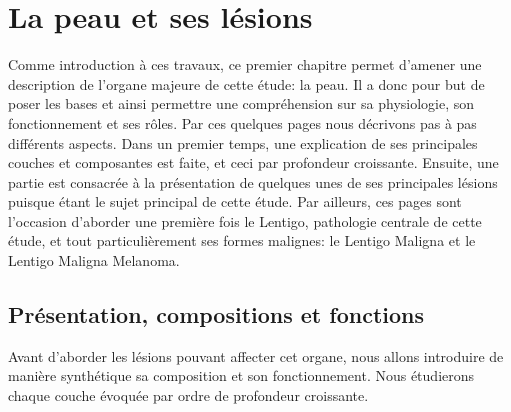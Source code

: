 \chapter{La peau et ses lésions}
\label{chap:chapter_1}
\chapterintro
Comme introduction à ces travaux, ce premier chapitre permet d'amener une description de l'organe majeure de cette étude: la peau. Il a donc pour but de poser les bases et ainsi permettre une compréhension sur sa physiologie, son fonctionnement et ses rôles. Par ces quelques pages nous décrivons pas à pas différents aspects. Dans un premier temps, une explication de ses principales couches et composantes est faite, et ceci par profondeur croissante. Ensuite, une partie est consacrée à la présentation de quelques unes de ses principales lésions puisque étant le sujet principal de cette étude. Par ailleurs, ces pages sont l'occasion d'aborder une première fois le Lentigo, pathologie centrale de cette étude, et tout particulièrement ses formes malignes: le Lentigo Maligna et le Lentigo Maligna Melanoma.\par
\newpage

\section{Présentation, compositions et fonctions}
Avant d’aborder les lésions pouvant affecter cet organe, nous allons introduire de manière synthétique sa composition et son fonctionnement. Nous étudierons chaque couche évoquée par ordre de profondeur croissante.\par

